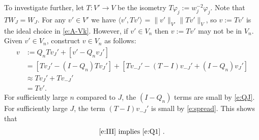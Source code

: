 \documentclass[12pt]{article}
\newcommand{\norm}[2]{\|#1\|_{#2}}
\newcommand{\scalar}[2]{\langle#1\rangle_{#2}}
\newcommand{\from}{\colon}
\begin{document}
	
	To investigate further,
	let $T \from V' \to V$
	be the isometry
	$T \varphi_j := w_j^{-2} \varphi_j$.
	Note that $T W_J = W_J$.
	For any $v' \in V'$ we have
	$\scalar{v', T v'}{} = \norm{v'}{V'} \norm{T v'}{V}$,
	so $v := T v'$ is the ideal choice in \eqref{e:A-Vk}.
	However,
	if $v' \in V_n$
	then $v := T v'$ may not be in $V_n$.
	Given $v' \in V_n$,
	construct $v \in V_n$ as follows:
	\begin{align}
		v 
		& 
		:=
		Q_n T v_J' + [v' - Q_n v_J']
		\\
		&
		= 
		[T v_J' - (I - Q_n) T v_J'] + 
		[T v_{-J}' - (T - I) v_{-J}' + (I - Q_n) v_J']
		\\
		&
		\approx
		T v_J' + T v_{-J}'
		\\
		&
		= T v'
		.
	\end{align}
	For sufficiently large $n$ compared to $J$,
	the $(I - Q_n)$ terms are small
	by \eqref{e:QJ}.
	For sufficiently large $J$,
	the term $(T - I) v_{-J}'$
	is small 
	by \eqref{e:spread}.
	This shows that
	\begin{align}
		\text{
			\eqref{e:III}
			implies
			\eqref{e:Q1}
			.
		}
	\end{align}
	
	
	
%	
%	
%	
%	
%	
	 
\end{document}
